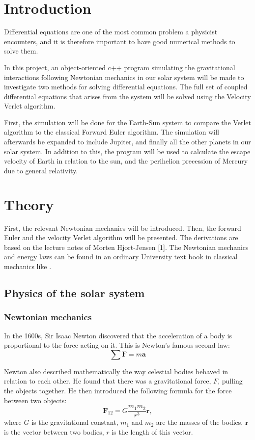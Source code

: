 \documentclass[10pt,a4paper,titlepage]{article}
\begin{document}
\section{Introduction}
Differential equations are one of the most common problem a physicist encounters, and it is therefore important to have good numerical methods to solve them. 
	
In this project, an object-oriented c++ program simulating the gravitational interactions following Newtonian mechanics in our solar system will be made to investigate two methods for solving differential equations. The full set of coupled differential equations that arises from the system will be solved using the Velocity Verlet algorithm. 

First, the simulation will be done for the Earth-Sun system to compare the Verlet algorithm to the classical Forward Euler algorithm. The simulation will afterwards be expanded to include Jupiter, and finally all the other planets in our solar system. In addition to this, the program will be used to calculate the escape velocity of Earth in relation to the sun, and the perihelion precession of Mercury due to general relativity. 


\section{Theory}
First, the relevant Newtonian mechanics will be introduced. Then, the forward Euler and the velocity Verlet algorithm will be presented. The derivations are based on the lecture notes of Morten Hjort-Jensen [1]. The Newtonian mechanics and energy laws can be found in an ordinary University text book in classical mechanics like \cite{physics}. 
\subsection{Physics of the solar system} 
\subsubsection{Newtonian mechanics}
In the 1600s, Sir Isaac Newton discovered that the acceleration of a body is proportional to the force acting on it. This is Newton's famous second law:
\begin{equation}
\label{eq:newt_2}
\sum\mathbf{F} = m\mathbf{a}
\end{equation}


Newton also described mathematically the way celestial bodies behaved in relation to each other. He found that there was a gravitational force, $F$, pulling the objects together. He then introduced the following formula for the force between two objects:
\begin{equation}
\mathbf{F}_{12}=G\frac{m_{1}m_{2}}{r^3}\mathbf{r},
\end{equation}
where $G$ is the gravitational constant, $m_1$ and $m_2$ are the masses of the bodies, $\mathbf{r}$ is the vector between two bodies, $r$ is the length of this vector. 
\end{document}
